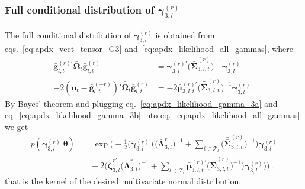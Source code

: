 \documentclass[12pt,a4paper]{article}
\theoremstyle{custom}
\begin{document}
\subsubsection{Full conditional distribution of $\boldsymbol{\gamma}_{3,l}^{(r)}$}
The full conditional distribution of $\boldsymbol{\gamma}_{3,l}^{(r)}$ is obtained from eqs.~\eqref{eq:apdx_vect_tensor_G3} and~\eqref{eq:apdx_likelihood_all_gammas}, where
\begin{align}
\label{eq:apdx_likelihood_gamma_3a}
\bar{\mathbf{g}}_{l,t}^{(r)\prime} \bar{\bar{\boldsymbol{\Omega}}}_t \bar{\mathbf{g}}_{l,t}^{(r)} & = \boldsymbol{\gamma}_{3,l}^{(r)\prime} \Big( \bar{\bar{\boldsymbol{\Sigma}}}_{3,l,t}^{(r)} \Big)^{-1} \boldsymbol{\gamma}_{3,l}^{(r)} \\
-2 (\mathbf{u}_t - \bar{\mathbf{g}}_{l,t}^{(-r)})' \bar{\bar{\boldsymbol{\Omega}}}_t \bar{\mathbf{g}}_{l,t}^{(r)} & = -2 \bar{\boldsymbol{\mu}}_{3,l,t}^{(r)\prime} \Big( \bar{\bar{\boldsymbol{\Sigma}}}_{3,l,t}^{(r)} \Big)^{-1} \boldsymbol{\gamma}_{3,l}^{(r)} \, .
\label{eq:apdx_likelihood_gamma_3b}
\end{align}
By Bayes' theorem and plugging eq.~\eqref{eq:apdx_likelihood_gamma_3a} and eq.~\eqref{eq:apdx_likelihood_gamma_3b} into eq.~\eqref{eq:apdx_likelihood_all_gammas} we get
\begin{align*}
p(\boldsymbol{\gamma}_{3,l}^{(r)} | \boldsymbol{\theta}) 
 & = \exp \Bigg( -\frac{1}{2} \Bigg( \boldsymbol{\gamma}_{3,l}^{(r)\prime} \Big( \Big( \bar{\boldsymbol{\Lambda}}_{3,l}^{r} \Big)^{-1} + \sum_{t\in\mathcal{T}_l} \Big(  \bar{\bar{\boldsymbol{\Sigma}}}_{3,l,t}^{(r)} \Big)^{-1} \Big) \boldsymbol{\gamma}_{3,l}^{(r)} \\ 
 & \quad -2 \Big( \bar{\boldsymbol{\zeta}}_{3,l}^{r'} \Big( \bar{\boldsymbol{\Lambda}}_{3,l}^{r} \Big)^{-1} + \sum_{t\in\mathcal{T}_l} \bar{\boldsymbol{\mu}}_{3,l,t}^{(r)\prime} \Big( \bar{\bar{\boldsymbol{\Sigma}}}_{3,l,t}^{(r)} \Big)^{-1} \Big) \boldsymbol{\gamma}_{3,l}^{(r)} \Bigg) \Bigg) \, .
\end{align*}
that is the kernel of the desired multivariate normal distribution.
\end{document}
